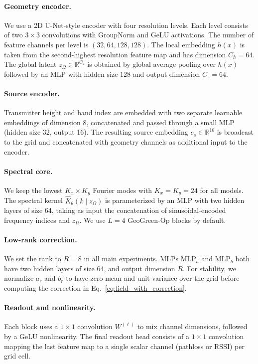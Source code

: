 \documentclass{article}
\begin{document}
\paragraph{Geometry encoder.}
We use a 2D U-Net-style encoder with four resolution levels.
Each level consists of two $3 \times 3$ convolutions with
GroupNorm and GeLU activations.
The number of feature channels per level is
$(32,64,128,128)$.
The local embedding $h(x)$ is taken from the second-highest
resolution feature map and has dimension $C_h = 64$.
The global latent $z_\Omega \in \mathbb{R}^{C_z}$ is obtained by
global average pooling over $h(x)$ followed by an MLP with
hidden size 128 and output dimension $C_z = 64$.

\paragraph{Source encoder.}
Transmitter height and band index are embedded with
two separate learnable embeddings of dimension 8, concatenated
and passed through a small MLP (hidden size 32, output 16).
The resulting source embedding $e_s \in \mathbb{R}^{16}$
is broadcast to the grid and concatenated with geometry channels
as additional input to the encoder.

\paragraph{Spectral core.}
We keep the lowest $K_x \times K_y$ Fourier modes with
$K_x = K_y = 24$ for all models.
The spectral kernel $\hat{K}_\theta(k \mid z_\Omega)$ is
parameterized by an MLP with two hidden layers of size 64,
taking as input the concatenation of sinusoidal-encoded
frequency indices and $z_\Omega$.
We use $L=4$ GeoGreen-Op blocks by default.

\paragraph{Low-rank correction.}
We set the rank to $R=8$ in all main experiments.
MLPs $\mathrm{MLP}_a$ and $\mathrm{MLP}_b$ both have
two hidden layers of size 64, and output dimension $R$.
For stability, we normalize $a_r$ and $b_r$ to have
zero mean and unit variance over the grid before computing
the correction in Eq.~\eqref{eq:field_with_correction}.

\paragraph{Readout and nonlinearity.}
Each block uses a $1 \times 1$ convolution $W^{(\ell)}$
to mix channel dimensions, followed by a GeLU nonlinearity.
The final readout head consists of a $1 \times 1$ convolution
mapping the last feature map to a single scalar channel
(pathloss or RSSI) per grid cell.
\end{document}
